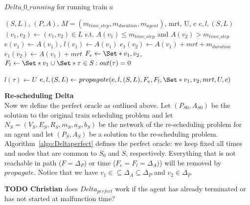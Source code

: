 \documentclass{article}
\begin{document}
\begin{algorithm}
	\caption{$Delta\_0\_running$ for running train $a$} \label{algo:Delta0running}
	\begin{algorithmic}[1]
		\Require $(S,L)$, $(P,A)$, $M=(m_{time\_step},m_{duration},m_{agent})$, mrt, U, c
	    \Ensure $e,l,(S,L)$
	    \State $(v_1,v_2) \leftarrow (v_1,v_2) \in L$ s.t. $A(v_1)\leq m_{time\_step}$ and $A(v_2)>m_{time\_step}$
		\State $e(v_1)\leftarrow A(v_1)$, $l(v_1) \leftarrow A(v_1)$
            \State $e_1(v_2) \leftarrow A(v_1)+mrt+m_{duration}$
        \Else
            \State $e_1(v_2) \leftarrow A(v_1)+mrt$
        \EndIf
        \State $F_e \leftarrow \Set*{v_1,v_2}$, $F_l \leftarrow \Set*{v_1} \cup \Set*{\tau \in S: out(\tau)=0}$

	        \State $l(\tau) \leftarrow U$
	    \EndFor
		\State $e,l,(S,L) \leftarrow propagate(e,l,(S,L),F_e,F_l, \Set*{v_1,v_2}, mrt, U, c)$
	\end{algorithmic}
\end{algorithm}







\noindent\textbf{Re-scheduling Delta}
\\
Now we define the perfect oracle as outlined above.
Let $(P_{S0},A_{S0})$ be the solution to the original train scheduling problem
and let $N_S=(V_S,E_S,R_S,m_S,a_S,b_S)$ be the network of the re-scheduling problem for an agent
and  let $(P_S,A_S)$ be a solution to the re-scheduling problem. Algorithm~\ref{algo:Deltaperfect} defines the perfect oracle: we keep fixed all times and nodes that are common to $S_0$ and $S$, respectively. Everything that is not reachable in path ($F=\Delta_P$) or time ($F_e=F_l=\Delta_A)$) will be removed by $propagate$. Notice that we have $v_1 \in\subseteq \Delta_A \subseteq \Delta_P$ and $v_2 \in \Delta_P$








\begin{mdframed}
{\bf TODO Christian} does $Delta_{perfect}$ work if the agent has already terminated or has not started at malfunction time?
\end{mdframed}
\end{document}
